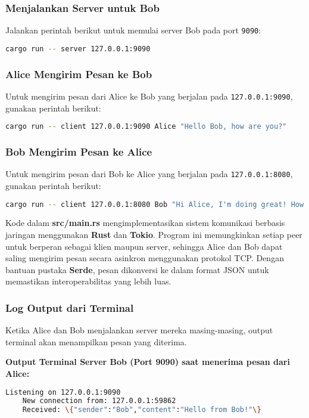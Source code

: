 \subsubsection{Menjalankan Server untuk Bob}
Jalankan perintah berikut untuk memulai server Bob pada port \texttt{9090}:
\begin{lstlisting}[language=bash]
	cargo run -- server 127.0.0.1:9090
\end{lstlisting}

\subsubsection{Alice Mengirim Pesan ke Bob}
Untuk mengirim pesan dari Alice ke Bob yang berjalan pada \texttt{127.0.0.1:9090}, gunakan perintah berikut:
\begin{lstlisting}[language=bash]
	cargo run -- client 127.0.0.1:9090 Alice "Hello Bob, how are you?"
\end{lstlisting}

\subsubsection{Bob Mengirim Pesan ke Alice}
Untuk mengirim pesan dari Bob ke Alice yang berjalan pada \texttt{127.0.0.1:8080}, gunakan perintah berikut:
\begin{lstlisting}[language=bash]
	cargo run -- client 127.0.0.1:8080 Bob "Hi Alice, I'm doing great! How about you?"
\end{lstlisting}

Kode dalam \textbf{src/main.rs} mengimplementasikan sistem komunikasi berbasis jaringan menggunakan \textbf{Rust} dan \textbf{Tokio}. Program ini memungkinkan setiap peer untuk berperan sebagai klien maupun server, sehingga Alice dan Bob dapat saling mengirim pesan secara asinkron menggunakan protokol TCP. Dengan bantuan pustaka \textbf{Serde}, pesan dikonversi ke dalam format JSON untuk memastikan interoperabilitas yang lebih luas.

\subsubsection{Log Output dari Terminal}
Ketika Alice dan Bob menjalankan server mereka masing-masing, output terminal akan menampilkan pesan yang diterima.

\textbf{Output Terminal Server Bob (Port 9090) saat menerima pesan dari Alice:}
\begin{lstlisting}[language=bash]
	Listening on 127.0.0.1:9090
	New connection from: 127.0.0.1:59862
	Received: \{"sender":"Bob","content":"Hello from Bob!"\}
\end{lstlisting}

